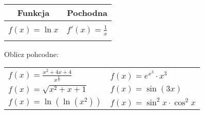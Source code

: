 \documentclass[12pt,a4paper]{article}
\theoremstyle{break}
\begin{document}
		\begin{center}\begin{tabular}{|c|c|}
			\hline
			Funkcja&Pochodna\\
			\hline&\\
			$f(x)=\ln x$&$f'(x)=\frac{1}{x}$ \\
			&\\\hline
		\end{tabular}\end{center}
	\begin{zad}
		Oblicz pohcodne:
	\end{zad}
\begin{enumerate}[a)]
	\begin{tabular}{p{7cm} p{7cm}}
		\item \Large$f(x)=\frac{x^2+4x+4}{x^\frac{3}{2}}$ & \vspace{0.5cm} \item $f(x)=e^{x^3}\cdot x^3$\\
		\item $f(x)=\sqrt{x^2+x+1}$& \item $f(x)=\sin(3x)$\\
		\item $f(x)=\ln(\ln(x^2))$& \item $f(x)=\sin^2x\cdot\cos^2x$\\
	\end{tabular}
\end{enumerate}
\end{document}
